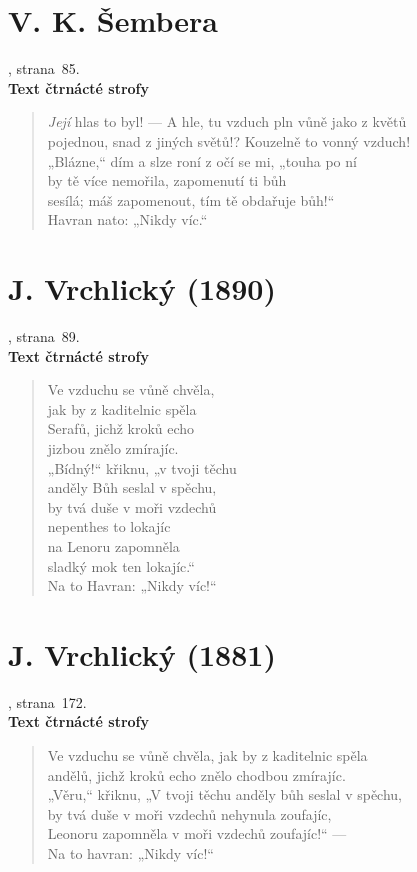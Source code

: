 \documentclass[dp.tex]{subfiles}
\begin{document}
\section*{V. K. Šembera}
, strana~85.
\\\textbf{Text čtrnácté strofy}
\begin{verse}
\textit{Její} hlas to byl! — A hle, tu vzduch pln vůně jako z květů\\
 pojednou, snad z jiných světů!? Kouzelně to vonný vzduch!\\
 „Blázne,“ dím a slze roní z očí se mi, „touha po ní\\
 by tě více nemořila, zapomenutí ti bůh\\
 sesílá; máš zapomenout, tím tě obdařuje bůh!“\\
\hspace*{0.8cm}Havran nato: „Nikdy víc.“
\end{verse}

\section*{J. Vrchlický (1890)}
, strana~89.
\\\textbf{Text čtrnácté strofy}
\begin{verse}
 Ve vzduchu se vůně chvěla,\\
 jak by z kaditelnic spěla\\
 Serafů, jichž kroků echo\\
 jizbou znělo zmírajíc.\\
 „Bídný!“ křiknu, „v tvoji těchu\\
 anděly Bůh seslal v spěchu,\\
 by tvá duše v moři vzdechů\\
 nepenthes to lokajíc\\
 na Lenoru zapomněla\\
 sladký mok ten lokajíc.“\\
\hspace*{0.8cm}Na to Havran: „Nikdy víc!“
\end{verse}

\section*{J. Vrchlický (1881)}
, strana~172.
\\\textbf{Text čtrnácté strofy}
\begin{verse}
 Ve vzduchu se vůně chvěla, jak by z kaditelnic spěla\\
 andělů, jichž kroků echo znělo chodbou zmírajíc.\\
 „Věru,“ křiknu, „V tvoji těchu anděly bůh seslal v spěchu,\\
 by tvá duše v moři vzdechů nehynula zoufajíc,\\
 Leonoru zapomněla v moři vzdechů zoufajíc!“ —\\
\hspace*{0.8cm}Na to havran: „Nikdy víc!“
\end{verse}
\end{document}
